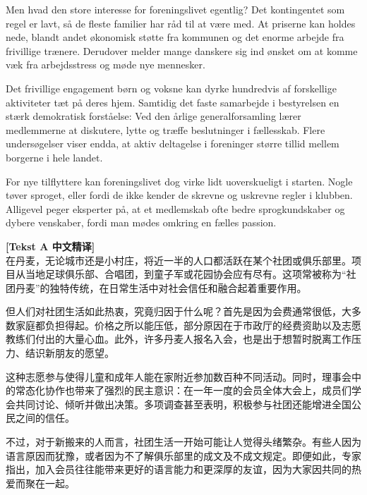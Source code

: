Men hvad  den store interesse for foreningslivet egentlig? Det  kontingentet som regel er lavt, så de fleste familier har råd til at være med. At priserne kan holdes nede,  blandt andet økonomisk støtte fra kommunen og det enorme arbejde fra frivillige trænere. Derudover melder mange danskere sig ind  ønsket om at komme væk fra arbejdsstress og møde nye mennesker.

Det frivillige engagement  børn og voksne kan dyrke hundredvis af forskellige aktiviteter tæt på deres hjem. Samtidig  det faste samarbejde i bestyrelsen  en stærk demokratisk forståelse: Ved den årlige generalforsamling lærer medlemmerne at diskutere, lytte og træffe beslutninger i fællesskab. Flere undersøgelser viser endda, at aktiv deltagelse i foreninger  større tillid mellem borgerne i hele landet.

For nye tilflyttere kan foreningslivet dog virke lidt uoverskueligt i starten. Nogle tøver  sproget, eller fordi de ikke kender de skrevne og uskrevne regler i klubben. Alligevel peger eksperter på, at et medlemskab ofte  bedre sprogkundskaber og dybere venskaber, fordi man mødes omkring en fælles passion.

\begin{transbox}
\small
\textbf{\color{NCDTeal}[Tekst A 中文精译]}\\
在丹麦，无论城市还是小村庄，将近一半的人口都活跃在某个社团或俱乐部里。项目从当地足球俱乐部、合唱团，到童子军或花园协会应有尽有。这项常被称为“社团丹麦”的独特传统，在日常生活中对社会信任和融合起着重要作用。

但人们对社团生活如此热衷，究竟归因于什么呢？首先是因为会费通常很低，大多数家庭都负担得起。价格之所以能压低，部分原因在于市政厅的经费资助以及志愿教练们付出的大量心血。此外，许多丹麦人报名入会，也是出于想暂时脱离工作压力、结识新朋友的愿望。

这种志愿参与使得儿童和成年人能在家附近参加数百种不同活动。同时，理事会中的常态化协作也带来了强烈的民主意识：在一年一度的会员全体大会上，成员们学会共同讨论、倾听并做出决策。多项调查甚至表明，积极参与社团还能增进全国公民之间的信任。

不过，对于新搬来的人而言，社团生活一开始可能让人觉得头绪繁杂。有些人因为语言原因而犹豫，或者因为不了解俱乐部里的成文及不成文规定。即便如此，专家指出，加入会员往往能带来更好的语言能力和更深厚的友谊，因为大家因共同的热爱而聚在一起。
\end{transbox}

